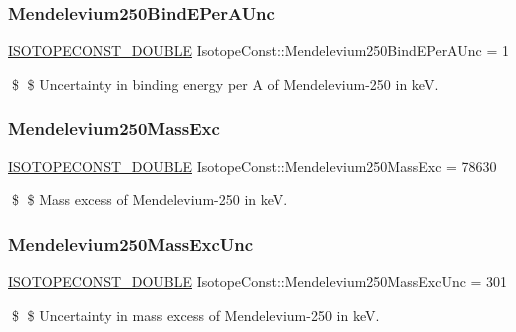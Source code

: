 \subsubsection{\texorpdfstring{Mendelevium250\+Bind\+E\+Per\+A\+Unc}{Mendelevium250BindEPerAUnc}}
{\footnotesize\ttfamily \mbox{\hyperlink{group___isotope_const-_macros_ga8f45a7272ce02c0b4c65c44636ed719a}{I\+S\+O\+T\+O\+P\+E\+C\+O\+N\+S\+T\+\_\+\+D\+O\+U\+B\+LE}} Isotope\+Const\+::\+Mendelevium250\+Bind\+E\+Per\+A\+Unc = 1}

\$ \$ Uncertainty in binding energy per A of Mendelevium-\/250 in keV. \mbox{\label{group___isotope_const-_mendelevium-_md250_ga9c915059a7350576f6e5ba46eca008f7}} 
\subsubsection{\texorpdfstring{Mendelevium250\+Mass\+Exc}{Mendelevium250MassExc}}
{\footnotesize\ttfamily \mbox{\hyperlink{group___isotope_const-_macros_ga8f45a7272ce02c0b4c65c44636ed719a}{I\+S\+O\+T\+O\+P\+E\+C\+O\+N\+S\+T\+\_\+\+D\+O\+U\+B\+LE}} Isotope\+Const\+::\+Mendelevium250\+Mass\+Exc = 78630}

\$ \$ Mass excess of Mendelevium-\/250 in keV. \mbox{\label{group___isotope_const-_mendelevium-_md250_ga4d93f9f13376c27a49fc4b03a50116d7}} 
\subsubsection{\texorpdfstring{Mendelevium250\+Mass\+Exc\+Unc}{Mendelevium250MassExcUnc}}
{\footnotesize\ttfamily \mbox{\hyperlink{group___isotope_const-_macros_ga8f45a7272ce02c0b4c65c44636ed719a}{I\+S\+O\+T\+O\+P\+E\+C\+O\+N\+S\+T\+\_\+\+D\+O\+U\+B\+LE}} Isotope\+Const\+::\+Mendelevium250\+Mass\+Exc\+Unc = 301}

\$ \$ Uncertainty in mass excess of Mendelevium-\/250 in keV. \mbox{\label{group___isotope_const-_mendelevium-_md250_ga51c942a234d8cadc66eff696796d6622}} 
